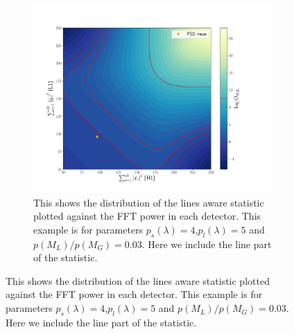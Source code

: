 \begin{figure}
\begin{subfigure}[h]{\linewidth}
\begin{minipage}{0.65\linewidth}
\includegraphics[width=1.\columnwidth]{C3_soap/lookup_linesmall.pdf}
\end{minipage}\hfill
\begin{minipage}{0.35\linewidth}
\caption{This shows the distribution of the lines aware statistic plotted against the \gls{FFT} power in each detector. This example is for parameters $p_s(\lambda) = 4$,$p_l(\lambda) = 5$ and $p(M_L)/p(M_G) = 0.03$. Here we include the line part of the statistic.}
\label{soap:las:detp:linesmall}
\end{minipage}
\end{subfigure}


\end{figure}
